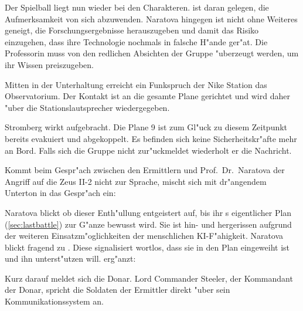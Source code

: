Der Spielball liegt nun wieder bei den Charakteren. \xl{} ist daran gelegen, die Aufmerksamkeit von sich abzuwenden. Naratova hingegen ist nicht ohne Weiteres geneigt, die Forschungsergebnisse herauszugeben und damit das Risiko einzugehen, dass ihre Technologie nochmals in falsche H"ande ger"at. Die Professorin muss von den redlichen Absichten der Gruppe "uberzeugt werden, um ihr Wissen preiszugeben.

Mitten in der Unterhaltung erreicht ein Funkspruch der Nike Station das Observatorium. Der Kontakt ist an die gesamte Plane gerichtet und wird daher "uber die Stationslautsprecher wiedergegeben.


Stromberg wirkt aufgebracht. Die Plane 9 ist zum Gl"uck zu diesem Zeitpunkt bereits evakuiert und abgekoppelt. Es befinden sich keine Sicherheitskr"afte mehr an Bord. Falls sich die Gruppe nicht zur"uckmeldet wiederholt er die Nachricht. 

Kommt beim Gespr"ach zwischen den Ermittlern und Prof.~Dr.~Naratova der Angriff auf die Zeus II-2 nicht zur Sprache, mischt sich \xl{} mit dr"angendem Unterton in das Gespr"ach ein:


Naratova blickt ob dieser Enth"ullung entgeistert auf, bis ihr \xl{}s eigentlicher Plan (\cref{sec:lastbattle}) zur G"anze bewusst wird. Sie ist hin- und hergerissen aufgrund der weiteren Einsatzm"oglichkeiten der menschlichen KI-F"ahigkeit. Naratova blickt fragend zu \ml{}. Diese signalisiert wortlos, dass sie in den Plan eingeweiht ist und ihn unterst"utzen will. \ml{} erg"anzt:


Kurz darauf meldet sich die Donar. Lord Commander Steeler, der Kommandant der Donar, spricht die Soldaten der Ermittler direkt "uber sein Kommunikationssystem an.


